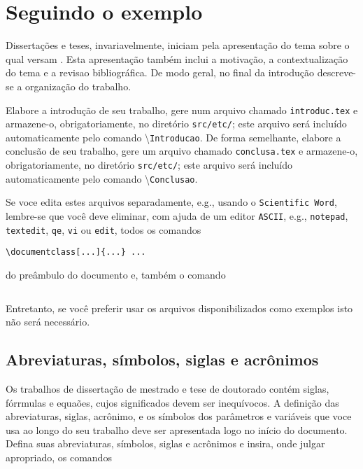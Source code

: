 
\chapter{Seguindo o exemplo\label{cap2}}

Dissertações e teses, invariavelmente, iniciam pela
apresentação do tema sobre o qual versam \cite{SP}. Esta
apresentação também inclui a motivação, a
contextualização do tema e a revisao bibliográfica. De modo geral, no final da introdução descreve-se a
organização do trabalho.

Elabore a introdução de seu trabalho, gere num
arquivo chamado \texttt{introduc.tex} e armazene-o, obrigatoriamente, no diretório \texttt{src/etc/}; este arquivo será incluído automaticamente pelo comando \textbackslash\texttt{Introducao}. De forma semelhante, elabore a conclusão de seu trabalho, gere um arquivo chamado \texttt{conclusa.tex} e armazene-o, obrigatoriamente, no diretório \texttt{src/etc/}; este arquivo será incluído automaticamente pelo comando \textbackslash\texttt{Conclusao}. 

Se voce edita estes arquivos separadamente, e.g., usando o \texttt{Scientific Word}, lembre-se que você deve eliminar, com ajuda de um editor \texttt{ASCII},
e.g., \texttt{notepad}, \texttt{textedit}, \texttt{qe}, \texttt{vi} ou \texttt{edit}, todos os comandos
\begin{verbatim}
\documentclass[...]{...} ... 
\end{verbatim}
\noindent do preâmbulo do documento e, também o comando
\begin{verbatim}

\end{verbatim}

Entretanto, se você preferir usar os arquivos disponibilizados como exemplos isto não será necessário.

\section{Abreviaturas, símbolos, siglas e acrônimos}

Os trabalhos de dissertação de mestrado e tese de doutorado contém
siglas, fórrmulas e equaões, cujos significados devem ser
inequívocos. A definição das abreviaturas, siglas, acrônimo, e os símbolos dos parâmetros e variáveis que voce usa ao longo do seu trabalho deve ser apresentada logo
no início do documento. Defina suas abreviaturas, símbolos, siglas e acrônimos e
insira, onde julgar apropriado, os comandos

